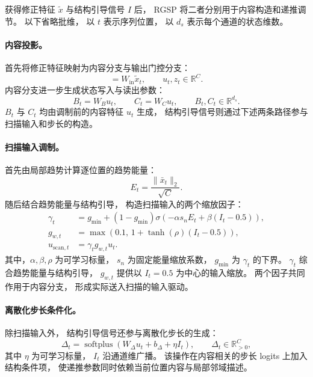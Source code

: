 \documentclass[journal]{IEEEtran}
\begin{document}
获得修正特征 $\tilde{x}$ 与结构引导信号 $I$ 后，
RGSP 将二者分别用于内容构造和递推调节。
以下省略批维，
以 $t$ 表示序列位置，
以 $d_s$ 表示每个通道的状态维数。

\paragraph{内容投影。}
首先将修正特征映射为内容分支与输出门控分支：
\begin{equation}
[u_t,z_t]
=
W_{\mathrm{in}}\tilde{x}_t,
\qquad
u_t,z_t\in\mathbb{R}^{C}.
\label{eq:input_projection}
\end{equation}
内容分支进一步生成状态写入与读出参数：
\begin{equation}
B_t=W_Bu_t,
\qquad
C_t=W_Cu_t,
\qquad
B_t,C_t\in\mathbb{R}^{d_s}.
\label{eq:ssm_parameters}
\end{equation}
$B_t$ 与 $C_t$ 均由调制前的内容特征 $u_t$ 生成，
结构引导信号则通过下述两条路径参与扫描输入和步长的构造。

\paragraph{扫描输入调制。}
首先由局部趋势计算逐位置的趋势能量：
\begin{equation}
E_t
=
\frac{\|\bar{x}_t\|_2}{\sqrt{C}}.
\label{eq:trend_energy}
\end{equation}
随后结合趋势能量与结构引导，
构造扫描输入的两个缩放因子：
\begin{align}
\gamma_t
&=
g_{\min}
+
(1-g_{\min})
\sigma\left(
-\alpha s_nE_t+\beta(I_t-0.5)
\right),
\label{eq:energy_modulation}\\
g_{w,t}
&=
\max\left(
0.1,\,
1+\tanh(\rho)(I_t-0.5)
\right),
\label{eq:write_modulation}\\
u_{\mathrm{scan},t}
&=
\gamma_tg_{w,t}u_t.
\label{eq:modulation}
\end{align}
其中，$\alpha,\beta,\rho$ 为可学习标量，
$s_n$ 为固定能量缩放系数，
$g_{\min}$ 为 $\gamma_t$ 的下界。
$\gamma_t$ 综合趋势能量与结构引导，
$g_{w,t}$ 提供以 $I_t=0.5$ 为中心的输入缩放。
两个因子共同作用于内容分支，
形成实际送入扫描的输入驱动。

\paragraph{离散化步长条件化。}
除扫描输入外，
结构引导信号还参与离散化步长的生成：
\begin{equation}
\Delta_t
=
\operatorname{softplus}
\left(
W_{\Delta}u_t+b_{\Delta}+\eta I_t
\right),
\qquad
\Delta_t\in\mathbb{R}_{>0}^{C},
\label{eq:delta_condition}
\end{equation}
其中 $\eta$ 为可学习标量，
$I_t$ 沿通道维广播。
该操作在内容相关的步长 logits 上加入结构条件项，
使递推参数同时依赖当前位置内容与局部邻域描述。
\end{document}
